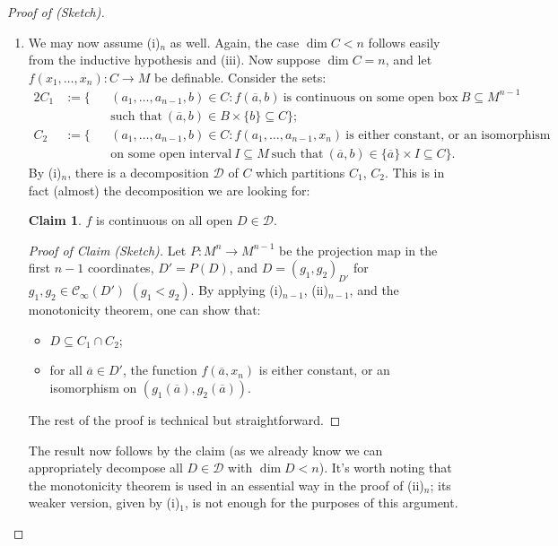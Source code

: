 \documentclass[a4paper]{report}
\makeatletter
\newcommand{\C}{\mathcal{C}}
\newcommand{\D}{\mathcal{D}}
\renewcommand{\a}{\overline{a}}
\theoremstyle{definition}
\theoremstyle{remstyle}
\newtheorem*{claim*}{Claim}
\providecommand*{\dashv}{%
	\mathrel{%
		\mathpalette\@dashv\vdash
	}%
}
\newcommand*{\@dashv}[2]{%
	\reflectbox{$\m@th#1#2$}%
}
\newenvironment{subproof}[1][\proofname]{%
	\renewcommand{\qedsymbol}{$\dashv$}%
	\begin{proof}[#1]%
	}{%
	\end{proof}%
}
\makeatother
\begin{document}
\begin{proof}[Proof of  (Sketch)]
\begin{itemize}[leftmargin=*,itemsep=12pt]
\begin{enumerate}[itemsep=12pt,label=(\roman*)$_n$]
			      \item We may now assume (i)$_n$ as well. Again, the case $\dim C<n$ follows easily from the inductive hypothesis and  (iii). Now suppose $\dim C=n$, and let $f(x_1,\ldots,x_n):C\to M$ be definable. Consider the sets:
			            \begin{alignat*}{2}
				            C_1 & := \big\{ &  & (a_1,\ldots,a_{n-1},b)\in C:f(\a,b)\ \text{is continuous on some open box}\ B\subseteq M^{n-1}           \\
				                &           &  & \text{such that}\ (\a,b)\in B\times\{b\}\subseteq C\big\};                                               \\
				            C_2 & := \big\{ &  & (a_1,\ldots,a_{n-1},b)\in C:f(a_1,\ldots,a_{n-1},x_n)\ \text{is either constant, or an isomorphism}      \\
				                &           &  & \text{on some open interval}\ I\subseteq M\ \text{such that}\ (\a,b)\in \{\a\}\times I\subseteq C\big\}.
			            \end{alignat*}
			            By (i)$_n$, there is a decomposition $\D$ of $C$ which partitions $C_1$, $C_2$. This is in fact (almost) the decomposition we are looking for:

			            \begin{claim*}
				            $f$ is continuous on all open $D\in\D$.
			            \end{claim*}

			            \begin{subproof}[Proof of Claim (Sketch)]
				            Let $P:M^n\to M^{n-1}$ be the projection map in the first $n-1$ coordinates, $D'=P(D)$, and $D=(g_1,g_2)_{D'}$ for $g_1,g_2\in\C_{\infty}(D')$ $(g_1<g_2)$. By applying (i)$_{n-1}$, (ii)$_{n-1}$, and the monotonicity theorem, one can show that:
				            \begin{itemize}
					            \item $D\subseteq C_1\cap C_2$;
					            \item for all $\a\in D'$, the function $f(\a,x_n)$ is either constant, or an isomorphism on $(g_1(\a),g_2(\a))$.
				            \end{itemize}
				            The rest of the proof is technical but straightforward.
			            \end{subproof}

			            The result now follows by the claim (as we already know we can appropriately decompose all $D\in\D$ with $\dim D < n$). It's worth noting that the monotonicity theorem is used in an essential way in the proof of (ii)$_n$; its weaker version, given by (i)$_1$, is not enough for the purposes of this argument.


\end{enumerate}
\end{itemize}
\end{proof}
\end{document}
